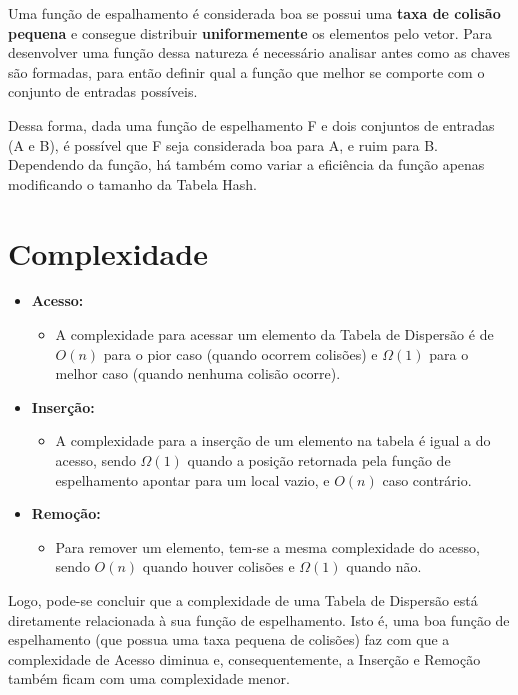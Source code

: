 \documentclass[12pt,openright,oneside,a4paper,english,brazil]{abntex2}
\begin{document}
    Uma função de espalhamento é considerada boa se possui uma \textbf{taxa de colisão pequena} e consegue distribuir \textbf{uniformemente} os elementos pelo vetor.
    Para desenvolver uma função dessa natureza é necessário analisar antes como as chaves são formadas, para então definir qual a função que melhor se comporte com o conjunto de entradas possíveis.

    Dessa forma, dada uma função de espelhamento F e dois conjuntos de entradas (A e B), é possível que F seja considerada boa para A, e ruim para B.
    Dependendo da função, há também como variar a eficiência da função apenas modificando o tamanho da Tabela Hash.

\section*{Complexidade}
    \begin{itemize}
        \item \textbf{Acesso:}
        \begin{itemize}[label={}]
            \item A complexidade para acessar um elemento da Tabela de Dispersão é de $O(n)$ para o pior caso (quando ocorrem colisões) e $\Omega(1)$ para o melhor caso (quando nenhuma colisão ocorre).
        \end{itemize}
        \item \textbf{Inserção:}
        \begin{itemize}[label={}]
            \item A complexidade para a inserção de um elemento na tabela é igual a do acesso, sendo $\Omega(1)$ quando a posição retornada pela função de espelhamento apontar para um local vazio, e $O(n)$ caso contrário.
        \end{itemize}
        \item \textbf{Remoção:}
        \begin{itemize}[label={}]
            \item Para remover um elemento, tem-se a mesma complexidade do acesso, sendo $O(n)$ quando houver colisões e $\Omega(1)$ quando não.
        \end{itemize}
    \end{itemize}

    Logo, pode-se concluir que a complexidade de uma Tabela de Dispersão está diretamente relacionada à sua função de espelhamento. Isto é, uma boa função de espelhamento (que possua uma taxa pequena de colisões) faz com que a complexidade de Acesso diminua e, consequentemente, a Inserção e Remoção também ficam com uma complexidade menor.
\end{document}
